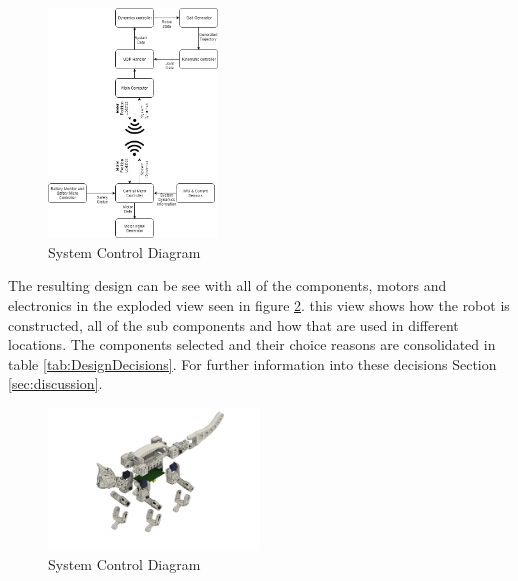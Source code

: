 \documentclass[conference]{IEEEtran}
\begin{document}
    \begin{figure}[H]
	\centering
      \includegraphics[width=0.4\textwidth]{Images/SmallKatControllerDiagram.png}
  	\caption{System Control Diagram}
  	\label{fig:controStructure}
\end{figure}

The resulting design can be see with all of the components, motors and electronics in the exploded view seen in figure \ref{fig:explodedView}. this view shows how the robot is constructed, all of the sub components and how that are used in different locations. The components selected and their choice reasons are consolidated in table \ref{tab:DesignDecisions}. For further information into these decisions Section \ref{sec:discussion}.


\begin{figure}[H]
	\centering
      \includegraphics[width=0.5\textwidth]{Images/ExplodedView.PNG}
  	\caption{System Control Diagram}
  	\label{fig:explodedView}
\end{figure}
\end{document}
